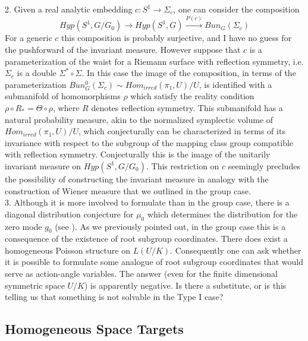 \documentclass{amsart}
\theoremstyle{conjecture}
\theoremstyle{definition}
\theoremstyle{question}
\theoremstyle{questions}
\theoremstyle{remark}
\theoremstyle{remarks}
\theoremstyle{example}
\numberwithin{equation}{section}
\begin{document}
2. Given a real analytic embedding $c:S^1\to \Sigma_c$, one can consider the composition
$$Hyp(S^1,G/G_0) \to Hyp(S^1,G) \stackrel{P(c)}{\rightarrow} Bun_G(\Sigma_c)$$
For a generic $c$ this composition is probably surjective, and I have no guess for the pushforward
of the invariant measure. However suppose that $c$ is a parameterization of the waist for a Riemann surface with reflection symmetry, i.e. $\Sigma_c$ is a double $\Sigma^*\circ \Sigma$. In this case the image of
the composition, in terms of the parameterization $Bun_G^0(\Sigma_c)\sim Hom_{irred}(\pi_1,U)/U$, is identified
with a submanifold of homomorphisms $\rho$ which satisfy the reality condition $\rho\circ R_*=\Theta\circ \rho$, where $R$ denotes reflection symmetry. This submanifold has a natural probability measure, akin to
the normalized symplectic volume of $Hom_{irred}(\pi_1,U)/U$, which conjecturally can be characterized in terms of its invariance with respect to the subgroup of the mapping class group compatible with reflection symmetry. Conjecturally this is the image of the unitarily invariant measure on $Hyp(S^1,G/G_0)$. This restriction on $c$ seemingly precludes
the possibility of constructing the invariant measure in analogy with the construction of Wiener measure that we outlined in the group case.\\

3. Although it is more involved to formulate than in the group case,
there is a diagonal distribution conjecture for $\mu_0$ which determines the distribution
for the zero mode $g_0$ (see \cite{Pi2}). As we previously pointed out, in the group case this is a consequence of the existence of root subgroup coordinates. There does exist a homogeneous Poisson structure on $L(U/K)$. Consequently one can ask whether it is possible to formulate some analogue of root subgroup coordinates that
would serve as action-angle variables. The answer (even for the finite dimensional symmetric space $U/K$) is apparently negative. Is there a substitute, or is this telling us
that something is not solvable in the Type I case?

\subsection{Homogeneous Space Targets}
\end{document}
